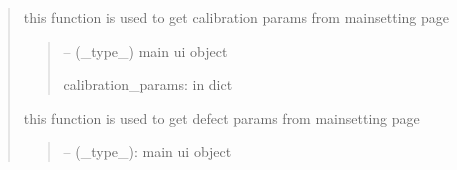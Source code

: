 \documentclass[letterpaper,10pt,english]{sphinxmanual}
\begin{document}
\begin{quote}
\begin{savenotes}
\begin{fulllineitems}
\end{fulllineitems}\end{savenotes}


\begin{savenotes}\begin{fulllineitems}
\label{\detokenize{setting/backend/mainsetting_funcs:oxin.backend.mainsetting_funcs.get_calibration_params_from_ui}}
\pysigstartsignatures
{}
\pysigstopsignatures
\sphinxAtStartPar
this function is used to get calibration params from main\sphinxhyphen{}setting page
\begin{quote}\begin{description}
\sphinxAtStartPar
{} – (\_type\_) main ui object

\sphinxAtStartPar
calibration\_params: in dict

\end{description}\end{quote}

\end{fulllineitems}\end{savenotes}


\begin{savenotes}\begin{fulllineitems}
\label{\detokenize{setting/backend/mainsetting_funcs:oxin.backend.mainsetting_funcs.get_defects_params_from_ui}}
\pysigstartsignatures
{}
\pysigstopsignatures
\sphinxAtStartPar
this function is used to get defect params from main\sphinxhyphen{}setting page
\begin{quote}\begin{description}
\sphinxAtStartPar
{} – (\_type\_): main ui object


\end{description}
\end{quote}
\end{fulllineitems}
\end{savenotes}
\end{quote}
\end{document}
